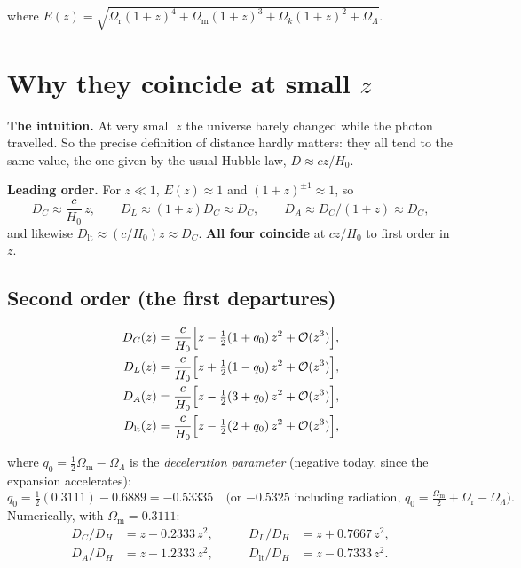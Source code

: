 \documentclass[11pt,a4paper,openany]{report}
\newcommand{\Hzero}{H_{0}}
\newcommand{\Om}{\Omega_{\mathrm{m}}}
\newcommand{\Or}{\Omega_{\mathrm{r}}}
\newcommand{\OL}{\Omega_{\Lambda}}
\newcommand{\Ok}{\Omega_{k}}
\begin{document}
\noindent where $E(z) = \sqrt{\Or(1+z)^{4} + \Om(1+z)^{3} + \Ok(1+z)^{2} + \OL}$.

\section{Why they coincide at small $z$}

\begin{tcolorbox}[plain]
\textbf{The intuition.} At very small $z$ the universe barely changed while the
photon travelled. So the precise definition of distance hardly matters: they
all tend to the same value, the one given by the usual Hubble law,
$D \approx cz/\Hzero$.
\end{tcolorbox}

\begin{tcolorbox}[undergrad]
\textbf{Leading order.} For $z \ll 1$, $E(z) \approx 1$ and
$(1+z)^{\pm 1} \approx 1$, so
\[
D_{C} \approx \frac{c}{\Hzero}\,z, \qquad
D_{L} \approx (1+z) D_{C} \approx D_{C}, \qquad
D_{A} \approx D_{C}/(1+z) \approx D_{C},
\]
and likewise $D_{\text{lt}} \approx (c/\Hzero)z \approx D_{C}$. \textbf{All four
coincide} at $cz/\Hzero$ to first order in $z$.
\end{tcolorbox}

\subsection{Second order (the first departures)}

\begin{align}
D_{C}(z)         &= \frac{c}{\Hzero}\Bigl[z - \tfrac{1}{2}(1+q_{0})\,z^{2} + \mathcal{O}(z^{3})\Bigr],
\label{eq:exp_DC}\\
D_{L}(z)         &= \frac{c}{\Hzero}\Bigl[z + \tfrac{1}{2}(1-q_{0})\,z^{2} + \mathcal{O}(z^{3})\Bigr],
\label{eq:exp_DL}\\
D_{A}(z)         &= \frac{c}{\Hzero}\Bigl[z - \tfrac{1}{2}(3+q_{0})\,z^{2} + \mathcal{O}(z^{3})\Bigr],
\label{eq:exp_DA}\\
D_{\text{lt}}(z) &= \frac{c}{\Hzero}\Bigl[z - \tfrac{1}{2}(2+q_{0})\,z^{2} + \mathcal{O}(z^{3})\Bigr],
\label{eq:exp_Dlt}
\end{align}

\noindent where $q_{0} = \tfrac{1}{2}\Om - \OL$ is the \emph{deceleration
parameter} (negative today, since the expansion accelerates):
\[
q_{0} = \tfrac{1}{2}(0.3111) - 0.6889 = -0.53335
\quad\text{(or $-0.5325$ including radiation, $q_0=\tfrac{\Om}{2}+\Or-\OL$).}
\]
Numerically, with $\Om = 0.3111$:
\[
\begin{aligned}
D_{C}/D_{H} &= z - 0.2333\,z^{2}, &\qquad D_{L}/D_{H} &= z + 0.7667\,z^{2},\\
D_{A}/D_{H} &= z - 1.2333\,z^{2}, &\qquad D_{\text{lt}}/D_{H} &= z - 0.7333\,z^{2}.
\end{aligned}
\]
\end{document}
